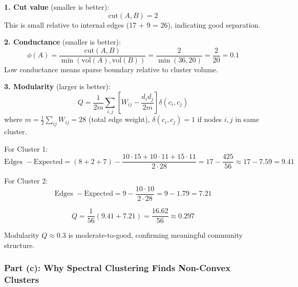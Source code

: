 \documentclass[12pt]{article}
\begin{document}
\begin{explanation}
\textbf{1. Cut value} (smaller is better):
\[
\text{cut}(A, B) = 2
\]
This is small relative to internal edges (17 + 9 = 26), indicating good separation.

\textbf{2. Conductance} (smaller is better):
\[
\phi(A) = \frac{\text{cut}(A, B)}{\min(\text{vol}(A), \text{vol}(B))} = \frac{2}{\min(36, 20)} = \frac{2}{20} = 0.1
\]
Low conductance means sparse boundary relative to cluster volume.

\textbf{3. Modularity} (larger is better):
\[
Q = \frac{1}{2m}\sum_{i,j}\left[W_{ij} - \frac{d_i d_j}{2m}\right]\delta(c_i, c_j)
\]
where $m = \frac{1}{2}\sum_{ij} W_{ij} = 28$ (total edge weight), $\delta(c_i, c_j) = 1$ if nodes $i, j$ in same cluster.

For Cluster 1:
\[
\text{Edges } - \text{Expected} = (8 + 2 + 7) - \frac{10 \cdot 15 + 10 \cdot 11 + 15 \cdot 11}{2 \cdot 28} = 17 - \frac{425}{56} \approx 17 - 7.59 = 9.41
\]

For Cluster 2:
\[
\text{Edges } - \text{Expected} = 9 - \frac{10 \cdot 10}{2 \cdot 28} = 9 - 1.79 = 7.21
\]

\[
Q = \frac{1}{56}(9.41 + 7.21) = \frac{16.62}{56} \approx 0.297
\]

Modularity $Q \approx 0.3$ is moderate-to-good, confirming meaningful community structure.

\end{explanation}

\subsubsection{Part (c): Why Spectral Clustering Finds Non-Convex Clusters}
\end{document}
